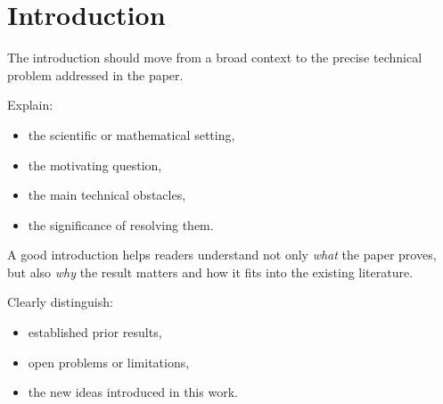 \documentclass[
    letterpaper,
    runningheads,
    USenglish
  ]{llncs}
\begin{document}
\begin{abstract}
	The abstract should communicate the core contribution of the paper in a
	self-contained form. A strong abstract typically answers four questions:
	\begin{itemize}
		\item What problem does the paper study?
		\item Why is the problem important or technically interesting?
		\item What are the main results or techniques?
		\item What limitations, assumptions, or implications matter most?
	\end{itemize}
	State the main theorem or contribution explicitly whenever possible.
	Avoid excessive notation, citations, undefined terminology, and long
	historical background. The abstract should remain readable to researchers
	outside the immediate specialization.
\end{abstract}


\section{Introduction}
\label{sec:introduction}

The introduction should move from a broad context to the precise technical
problem addressed in the paper.

Explain:
\begin{itemize}
	\item the scientific or mathematical setting,
	\item the motivating question,
	\item the main technical obstacles,
	\item the significance of resolving them.
\end{itemize}

A good introduction helps readers understand not only \emph{what} the
paper proves, but also \emph{why} the result matters and how it fits
into the existing literature.

Clearly distinguish:
\begin{itemize}
	\item established prior results,
	\item open problems or limitations,
	\item the new ideas introduced in this work.
\end{itemize}
\end{document}
